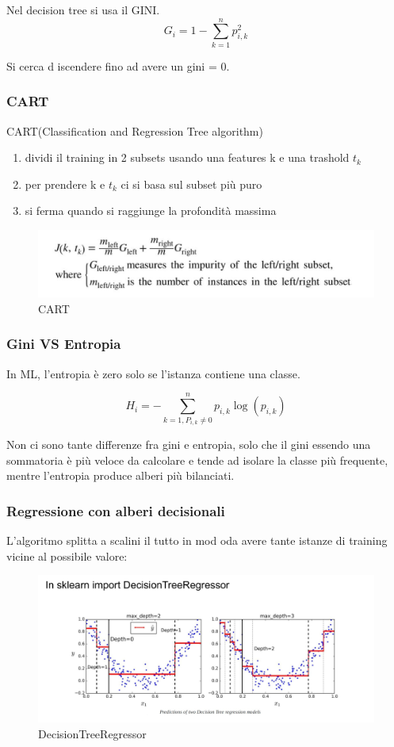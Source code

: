 Nel decision tree si usa il GINI.
\begin{equation}
    G_i = 1 - \sum_{k=1}^{n}p_{i,k}^2
\end{equation}

Si cerca d iscendere fino ad avere un gini = 0.

\subsubsection{CART}
CART(Classification and Regression Tree algorithm)
\begin{enumerate}
    \item dividi il training in 2 subsets usando una features k e una trashold $t_k$
    \item per prendere k e $t_k$ ci si basa sul subset più puro
    \item si ferma quando si raggiunge la profondità massima
\end{enumerate}

\begin{figure}[H]
    \centering
    \includegraphics[width=0.7\linewidth]{imgs/cart}
    \caption{CART}
    \label{fig:CART}
\end{figure}

\subsubsection{Gini VS Entropia}
In ML, l'entropia è zero solo se l'istanza contiene una classe.

\begin{equation}
    H_i = - \sum_{k=1, P_{i,k}\neq 0}^{n}
    p_{i,k}\log(p_{i,k})
\end{equation}

Non ci sono tante differenze fra gini e entropia, solo che il gini essendo una sommatoria
è più veloce da calcolare e tende ad isolare la classe più frequente,
mentre l'entropia produce alberi più bilanciati.

\subsubsection{Regressione con alberi decisionali}
L'algoritmo splitta a scalini il tutto in mod oda avere tante istanze
di training vicine al possibile valore:
\begin{figure}[H]
    \centering
    \includegraphics[width=0.5\linewidth]{imgs/decisiontreeregressor}
    \caption{DecisionTreeRegressor}
    \label{fig:DecisionTreeRegressor}
\end{figure}


